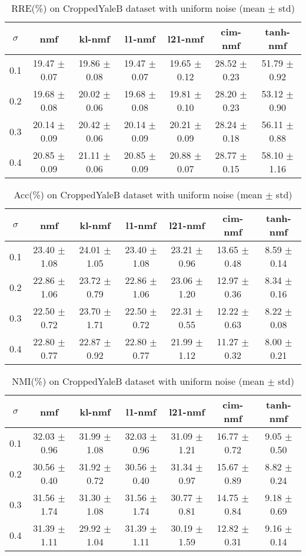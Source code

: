 \documentclass{article} %
\begin{document}
\begin{table}[H]
\begin{tabular}{c|cccccc}$\sigma$ & nmf & kl-nmf & l1-nmf & l21-nmf & cim-nmf & tanh-nmf \\\hline
0.1 & 19.47 $\pm$ 0.07 & 19.86 $\pm$ 0.08 & 19.47 $\pm$ 0.07 & 19.65 $\pm$ 0.12 & 28.52 $\pm$ 0.23 & 51.79 $\pm$ 0.92 \\
0.2 & 19.68 $\pm$ 0.08 & 20.02 $\pm$ 0.06 & 19.68 $\pm$ 0.08 & 19.81 $\pm$ 0.10 & 28.20 $\pm$ 0.23 & 53.12 $\pm$ 0.90 \\
0.3 & 20.14 $\pm$ 0.09 & 20.42 $\pm$ 0.06 & 20.14 $\pm$ 0.09 & 20.21 $\pm$ 0.09 & 28.24 $\pm$ 0.18 & 56.11 $\pm$ 0.88 \\
0.4 & 20.85 $\pm$ 0.09 & 21.11 $\pm$ 0.06 & 20.85 $\pm$ 0.09 & 20.88 $\pm$ 0.07 & 28.77 $\pm$ 0.15 & 58.10 $\pm$ 1.16 \\
\end{tabular}\caption{
  RRE(\%) on CroppedYaleB dataset with uniform noise (mean $\pm$ std)
  \label{tab:RRE-CroppedYaleB-uniform}
}\end{table}
\begin{table}[H]
\begin{tabular}{c|cccccc}$\sigma$ & nmf & kl-nmf & l1-nmf & l21-nmf & cim-nmf & tanh-nmf \\\hline
0.1 & 23.40 $\pm$ 1.08 & 24.01 $\pm$ 1.05 & 23.40 $\pm$ 1.08 & 23.21 $\pm$ 0.96 & 13.65 $\pm$ 0.48 & 8.59 $\pm$ 0.14 \\
0.2 & 22.86 $\pm$ 1.06 & 23.72 $\pm$ 0.79 & 22.86 $\pm$ 1.06 & 23.06 $\pm$ 1.20 & 12.97 $\pm$ 0.36 & 8.34 $\pm$ 0.16 \\
0.3 & 22.50 $\pm$ 0.72 & 23.70 $\pm$ 1.71 & 22.50 $\pm$ 0.72 & 22.31 $\pm$ 0.55 & 12.22 $\pm$ 0.63 & 8.22 $\pm$ 0.08 \\
0.4 & 22.80 $\pm$ 0.77 & 22.87 $\pm$ 0.92 & 22.80 $\pm$ 0.77 & 21.99 $\pm$ 1.12 & 11.27 $\pm$ 0.32 & 8.00 $\pm$ 0.21 \\
\end{tabular}\caption{
  Acc(\%) on CroppedYaleB dataset with uniform noise (mean $\pm$ std)
  \label{tab:Acc-CroppedYaleB-uniform}
}\end{table}
\begin{table}[H]
\begin{tabular}{c|cccccc}$\sigma$ & nmf & kl-nmf & l1-nmf & l21-nmf & cim-nmf & tanh-nmf \\\hline
0.1 & 32.03 $\pm$ 0.96 & 31.99 $\pm$ 1.08 & 32.03 $\pm$ 0.96 & 31.09 $\pm$ 1.21 & 16.77 $\pm$ 0.72 & 9.05 $\pm$ 0.50 \\
0.2 & 30.56 $\pm$ 0.40 & 31.92 $\pm$ 0.72 & 30.56 $\pm$ 0.40 & 31.34 $\pm$ 0.97 & 15.67 $\pm$ 0.89 & 8.82 $\pm$ 0.24 \\
0.3 & 31.56 $\pm$ 1.74 & 31.30 $\pm$ 1.08 & 31.56 $\pm$ 1.74 & 30.77 $\pm$ 0.81 & 14.75 $\pm$ 0.84 & 9.18 $\pm$ 0.69 \\
0.4 & 31.39 $\pm$ 1.11 & 29.92 $\pm$ 1.04 & 31.39 $\pm$ 1.11 & 30.19 $\pm$ 1.59 & 12.82 $\pm$ 0.31 & 9.16 $\pm$ 0.14 \\
\end{tabular}\caption{
  NMI(\%) on CroppedYaleB dataset with uniform noise (mean $\pm$ std)
  \label{tab:NMI-CroppedYaleB-uniform}
}\end{table}
\end{document}
